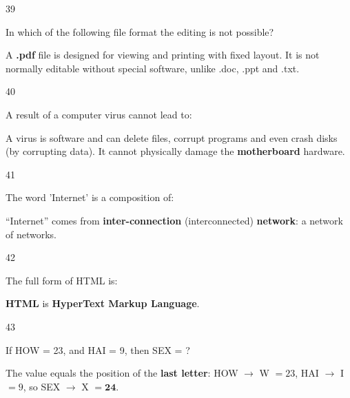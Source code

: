 \begin{question}{39}
{In which of the following file format the editing is not possible?\par}
\begin{explain}
A \textbf{.pdf} file is designed for viewing and printing with fixed layout. It is not normally editable without special software, unlike .doc, .ppt and .txt.
\end{explain}
\end{question}

\begin{question}{40}
{A result of a computer virus cannot lead to:\par}
\begin{explain}
A virus is software and can delete files, corrupt programs and even crash disks (by corrupting data). It cannot physically damage the \textbf{motherboard} hardware.
\end{explain}
\end{question}

\begin{question}{41}
{The word 'Internet' is a composition of:\par}
\begin{explain}
``Internet'' comes from \textbf{inter-connection} (interconnected) \textbf{network}: a network of networks.
\end{explain}
\end{question}

\begin{question}{42}
{The full form of HTML is:\par}
\begin{explain}
\textbf{HTML} is \textbf{HyperText Markup Language}.
\end{explain}
\end{question}

\begin{question}{43}
{If HOW = 23, and HAI = 9, then SEX = ?\par}
\begin{explain}
The value equals the position of the \textbf{last letter}: HOW $\rightarrow$ W $=23$, HAI $\rightarrow$ I $=9$, so SEX $\rightarrow$ X $=\mathbf{24}$.
\end{explain}
\end{question}

